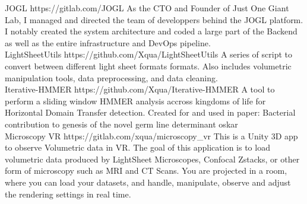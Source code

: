 \documentclass[]{twentysecondcv}
\begin{document}
\begin{twenty}
  \twentyitemproject
    {JOGL}
    {https://gitlab.com/JOGL}
    {As the CTO and Founder of Just One Giant Lab, I managed and directed the team of developpers behind the JOGL platform. I notably created the system architecture and coded a large part of the Backend as well as the entire infrastructure and DevOps pipeline.}
    \\
  \twentyitemproject
    {LightSheetUtils}
    {https://github.com/Xqua/LightSheetUtils}
    {A series of script to convert between different light sheet formats formats. Also includes volumetric manipulation tools, data preprocessing, and data cleaning.}
    \\
  \twentyitemproject
    {Iterative-HMMER}
    {https://github.com/Xqua/Iterative-HMMER}
    {A tool to perform a sliding window HMMER analysis accross kingdoms of life for Horizontal Domain Transfer detection. Created for and used in paper: Bacterial contribution to genesis of the novel germ line determinant oskar}
    \\
  \twentyitemproject
    {Microscopy VR}
    {https://gitlab.com/xqua/microscopy_vr}
    {This is a Unity 3D app to observe Volumetric data in VR. The goal of this application is to load volumetric data produced by LightSheet Microscopes, Confocal Zstacks, or other form of microscopy such as MRI and CT Scans. You are projected in a room, where you can load your datasets, and handle, manipulate, observe and adjust the rendering settings in real time.}        
\end{twenty}
\end{document}
